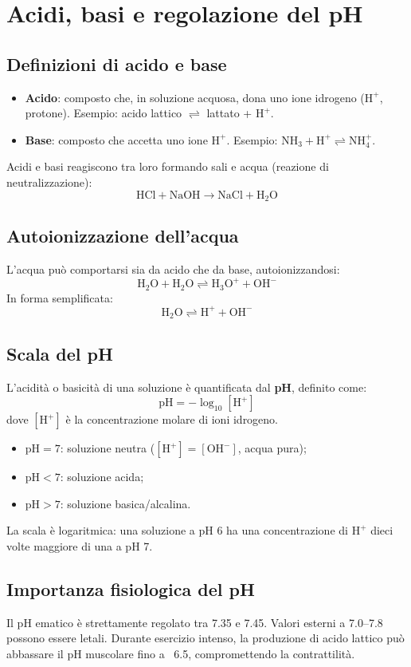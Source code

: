 \documentclass[12pt,a4paper]{report}
\begin{document}
\section{Acidi, basi e regolazione del pH}
\subsection{Definizioni di acido e base}
\begin{itemize}
\item \textbf{Acido}: composto che, in soluzione acquosa, dona uno ione idrogeno (\(\mathrm{H^+}\), protone). Esempio: acido lattico \(\rightleftharpoons\) lattato + \(\mathrm{H^+}\).
\item \textbf{Base}: composto che accetta uno ione \(\mathrm{H^+}\). Esempio: \(\mathrm{NH_3 + H^+ \rightleftharpoons NH_4^+}\).
\end{itemize}
Acidi e basi reagiscono tra loro formando sali e acqua (reazione di neutralizzazione): 
\[
\mathrm{HCl + NaOH \rightarrow NaCl + H_2O}
\]
\subsection{Autoionizzazione dell'acqua}
L'acqua può comportarsi sia da acido che da base, autoionizzandosi:
\[
\mathrm{H_2O + H_2O \rightleftharpoons H_3O^+ + OH^-}
\]
In forma semplificata:
\[
\mathrm{H_2O \rightleftharpoons H^+ + OH^-}
\]
\subsection{Scala del pH}
L'acidità o basicità di una soluzione è quantificata dal \textbf{pH}, definito come:
\[
\mathrm{pH} = -\log_{10}[\mathrm{H^+}]
\]
dove \([\mathrm{H^+}]\) è la concentrazione molare di ioni idrogeno.
\begin{itemize}
\item \(\mathrm{pH} = 7\): soluzione neutra (\([\mathrm{H^+}] = [\mathrm{OH^-}]\), acqua pura);
\item \(\mathrm{pH} < 7\): soluzione acida;
\item \(\mathrm{pH} > 7\): soluzione basica/alcalina.
\end{itemize}
La scala è logaritmica: una soluzione a pH 6 ha una concentrazione di \(\mathrm{H^+}\) dieci volte maggiore di una a pH 7.
\subsection{Importanza fisiologica del pH}
Il pH ematico è strettamente regolato tra 7.35 e 7.45. Valori esterni a 7.0--7.8 possono essere letali. Durante esercizio intenso, la produzione di acido lattico può abbassare il pH muscolare fino a ~6.5, compromettendo la contrattilità.
\end{document}
